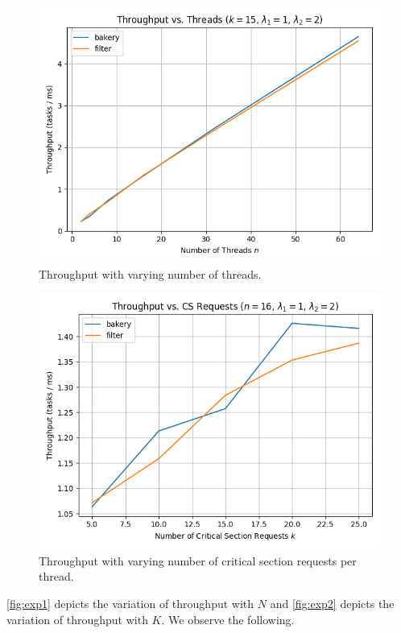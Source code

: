 \documentclass[conference,compsoc]{IEEEtran}
\begin{document}
\begin{figure}[!ht]
    \centering
    \includegraphics[width=\columnwidth]{images/exp1.png} 
    \caption{Throughput with varying number of threads.}
    \label{fig:exp1}
\end{figure}

\begin{figure}[!ht]
    \centering
    \includegraphics[width=\columnwidth]{images/exp2.png} 
    \caption{Throughput with varying number of critical section requests per thread.}
    \label{fig:exp2}
\end{figure}

\autoref{fig:exp1} depicts the variation of throughput with \(N\) and
\autoref{fig:exp2} depicts the variation of throughput with \(K\). We observe
the following.
\end{document}
